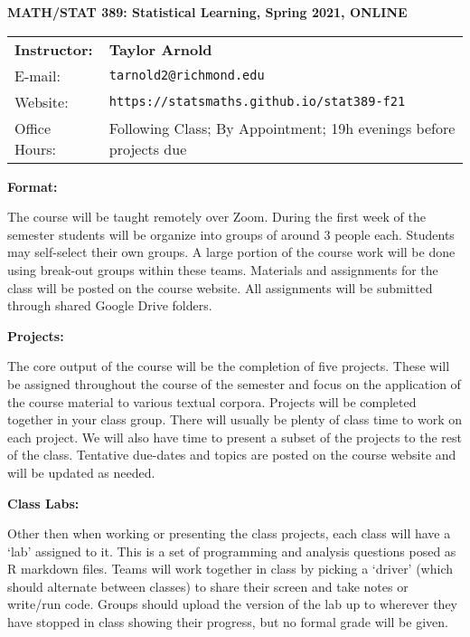 \documentclass[12pt, a4paper]{article}
\begin{document}
\begin{center}
\textbf{MATH/STAT 389: Statistical Learning, Spring 2021, ONLINE}
\end{center}

\noindent
\begin{tabular}{ l l }
\textbf{Instructor:} &  \textbf{Taylor Arnold} \\
E-mail: & \texttt{tarnold2@richmond.edu} \\
Website: & \texttt{https://statsmaths.github.io/stat389-f21} \\
Office Hours: & Following Class; By Appointment; 19h evenings before projects due
\end{tabular}

\vspace{0.5cm}

\textbf{Format:} \vspace{6pt}

The course will be taught remotely over Zoom. During the first week of the
semester students will be organize into groups of around 3 people each.
Students may self-select their own groups. A large portion of the course work
will be done using break-out groups within these teams. Materials and
assignments for the class will be posted on the course website. All assignments
will be submitted through shared Google Drive folders.

\vspace{12pt}

\textbf{Projects:} \vspace{6pt}

The core output of the course will be the completion of five projects. These
will be assigned throughout the course of the semester and focus on the
application of the course material to various textual corpora. Projects will
be completed together in your class group. There will usually be plenty of
class time to work on each project. We will also have time to present a subset
of the projects to the rest of the class. Tentative due-dates and topics are
posted on the course website and will be updated as needed.

\vspace{12pt}

\textbf{Class Labs:} \vspace{6pt}

Other then when working or presenting the class projects, each class will have
a `lab' assigned to it. This is a set of programming and analysis questions
posed as R markdown files. Teams will work together in class by picking a
`driver' (which should alternate between classes) to share their screen and
take notes or write/run code. Groups should upload the version of the lab up to
wherever they have stopped in class showing their progress, but no formal grade
will be given.
\end{document}
